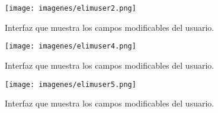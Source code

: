 \clearpage

\begin{figure}[h!]
	\label{elimuser2}
	\begin{center}
		\texttt{[image: imagenes/elimuser2.png]}
	\end{center}
	\caption{Interfaz que muestra los campos modificables del usuario.}
\end{figure}

\begin{figure}[h!]
	\label{elimuser4}
	\begin{center}
		\texttt{[image: imagenes/elimuser4.png]}
	\end{center}
	\caption{Interfaz que muestra los campos modificables del usuario.}
\end{figure}

\clearpage

\begin{figure}[h!]
	\label{elimuser5}
	\begin{center}
		\texttt{[image: imagenes/elimuser5.png]}
	\end{center}
	\caption{Interfaz que muestra los campos modificables del usuario.}
\end{figure}

